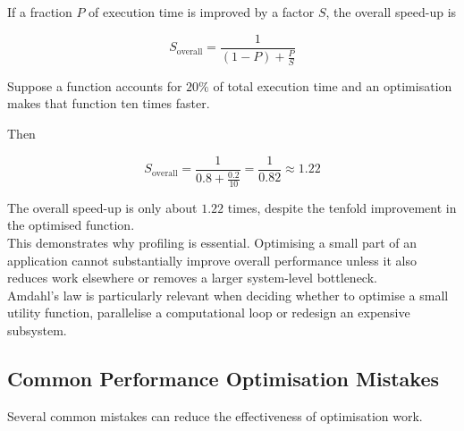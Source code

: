 If a fraction \(P\) of execution time is improved by a factor \(S\), the overall speed-up is

\[
S_{\mathrm{overall}}
=
\frac{1}
{(1-P)+\frac{P}{S}}
\]

Suppose a function accounts for \(20\%\) of total execution time and an optimisation makes that function ten times faster.

Then

\[
S_{\mathrm{overall}}
=
\frac{1}
{0.8+\frac{0.2}{10}}
=
\frac{1}{0.82}
\approx 1.22
\]

The overall speed-up is only about \(1.22\) times, despite the tenfold improvement in the optimised function.\\

This demonstrates why profiling is essential. Optimising a small part of an application cannot substantially improve overall performance unless it also reduces work elsewhere or removes a larger system-level bottleneck.\\

Amdahl's law is particularly relevant when deciding whether to optimise a small utility function, parallelise a computational loop or redesign an expensive subsystem.

\subsection{Common Performance Optimisation Mistakes}

Several common mistakes can reduce the effectiveness of optimisation work.

